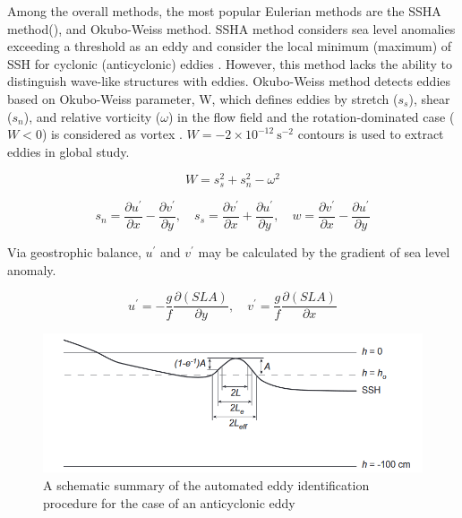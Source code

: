 Among the overall methods, the most popular Eulerian methods are the SSHA method(\cite{roemmich2001eddy}), and Okubo-Weiss method. SSHA method considers sea level anomalies exceeding a threshold as an eddy and consider the local minimum (maximum) of SSH for cyclonic (anticyclonic) eddies \cite{chelton2011global}. However, this method lacks the ability to distinguish wave-like structures with eddies. Okubo-Weiss method detects eddies based on Okubo-Weiss parameter, W, which defines eddies by stretch ($s_{s}$), shear ($s_{n}$), and relative vorticity ($\omega$) in the flow field and the rotation-dominated case ($W < 0$) is considered as vortex \cite{calil2008eddy,chelton2007global}. $W=-2 \times 10^{-12} \mathrm{~s}^{-2}$ contours is used to extract eddies in global study.

\begin{equation}
    W=s_{s}^{2}+s_{n}^{2}-\omega^{2} 
\end{equation}

\begin{equation}
    s_{n}=\frac{\partial u^{\prime}}{\partial x}-\frac{\partial v^{\prime}}{\partial y}, \quad s_{s}=\frac{\partial v^{\prime}}{\partial x}+\frac{\partial u^{\prime}}{\partial y}, \quad w=\frac{\partial v^{\prime}}{\partial x}-\frac{\partial u^{\prime}}{\partial y}
\end{equation}

Via geostrophic balance, $u^{\prime}$ and $v^{\prime}$ may be calculated by the gradient of sea level anomaly.

\begin{equation}
    u^{\prime}=-\frac{g}{f} \frac{\partial(SLA)}{\partial y}, \quad v^{\prime}=\frac{g}{f} \frac{\partial(SLA)}{\partial x}
    \label{Geostrophic anomaly velocity}
\end{equation}

\begin{figure}[ht]
	\centering
	\includegraphics[width=15cm]{chapter/figure/A schematic summary of the automated eddy identification procedure for the case of an anticyclonic eddy.png}
	\caption
	{A schematic summary of the automated eddy identification procedure for the case of an anticyclonic eddy 
		\cite{chelton2011global} }
	\label{A schematic SSHA anticyclonic eddy}
\end{figure}

